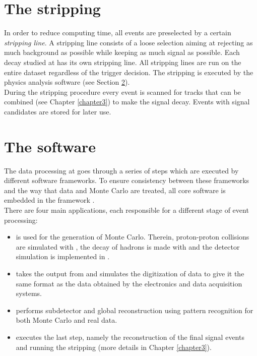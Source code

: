 \section{The \lhcb stripping}
In order to reduce computing time, all events are preselected by a certain \textit{stripping line}. A stripping line consists of a loose selection aiming at rejecting as much background as possible while keeping as much signal as possible. Each decay studied at \lhcb has its own stripping line. All stripping lines are run on the entire dataset regardless of the trigger decision. The stripping is executed by the physics analysis software \davinci (see Section \ref{sec:software}).\\
During the stripping procedure every event is scanned for tracks that can be combined (see Chapter \ref{chapter3}) to make the signal decay. Events with signal candidates are stored for later use.\\

\section{The \lhcb software}
\label{sec:software}
The data processing at \lhcb goes through a series of steps which are executed by different software frameworks. To ensure consistency between these frameworks and the way that data and Monte Carlo are treated, all \lhcb core software is embedded in the \gaudi framework \cite{gaudi}.\\
There are four main applications, each responsible for a different stage of event processing:
\\
\begin{itemize}
\item \textbf{\gauss}is used for the generation of Monte Carlo. Therein, proton-proton collisions are simulated with \pythia \cite{pythia}, the decay of \B hadrons is made with \evtgen \cite{evtgen} and the detector simulation is implemented in \geant \cite{geant}.\\
\item \textbf{\boole}takes the output from \gauss and simulates the digitization of data to give it the same format as the \lhcb data obtained by the electronics and data acquisition systems.\\
\item \textbf{\brunel}performs subdetector and global reconstruction using pattern recognition for both Monte Carlo and real data.\\
\item \textbf{\davinci}executes the last step, namely the reconstruction of the final signal events and running the stripping \cite{davinci}(more details in Chapter \ref{chapter3}).
\end{itemize}

